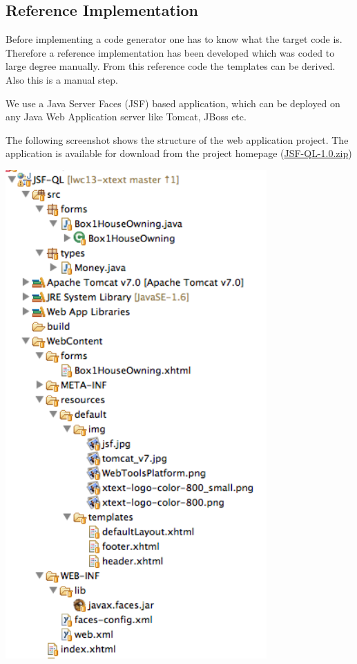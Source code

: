 \subsection{Reference Implementation}

Before implementing a code generator one has to know what the target code is. Therefore a reference implementation has been
developed which was coded to large degree manually. From this reference code the templates can be derived. Also this is a
manual step.

We use a Java Server Faces (JSF) based application, which can be deployed on any Java Web Application server like Tomcat, JBoss etc.

The following screenshot shows the structure of the web application project. The application is available for download from the project 
homepage (\href{http://lwc13-xtext.eclipselabs.org.codespot.com/files/JSF-QL-1.0.zip}{JSF-QL-1.0.zip})

\includegraphics[width=10cm]{./images/chapter02/referenceimpl_projecttree.png}

